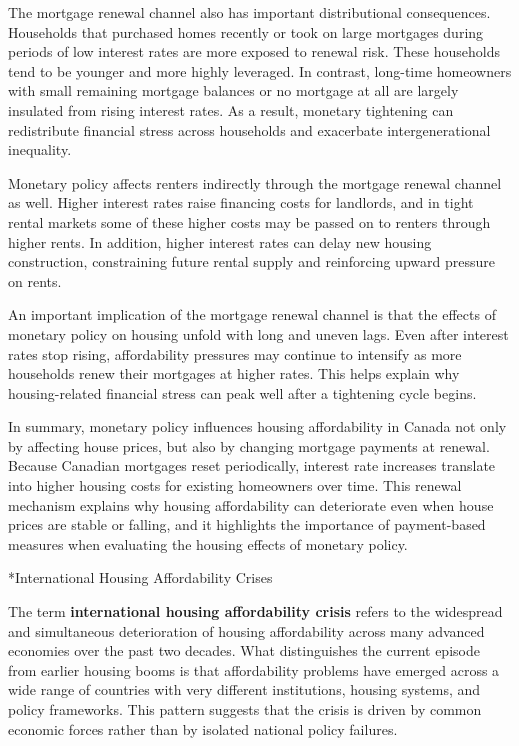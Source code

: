 \documentclass[11pt]{article}
\begin{document}
The mortgage renewal channel also has important distributional consequences. Households that purchased homes recently or took on large mortgages during periods of low interest rates are more exposed to renewal risk. These households tend to be younger and more highly leveraged. In contrast, long-time homeowners with small remaining mortgage balances or no mortgage at all are largely insulated from rising interest rates. As a result, monetary tightening can redistribute financial stress across households and exacerbate intergenerational inequality.

Monetary policy affects renters indirectly through the mortgage renewal channel as well. Higher interest rates raise financing costs for landlords, and in tight rental markets some of these higher costs may be passed on to renters through higher rents. In addition, higher interest rates can delay new housing construction, constraining future rental supply and reinforcing upward pressure on rents.

An important implication of the mortgage renewal channel is that the effects of monetary policy on housing unfold with long and uneven lags. Even after interest rates stop rising, affordability pressures may continue to intensify as more households renew their mortgages at higher rates. This helps explain why housing-related financial stress can peak well after a tightening cycle begins.

In summary, monetary policy influences housing affordability in Canada not only by affecting house prices, but also by changing mortgage payments at renewal. Because Canadian mortgages reset periodically, interest rate increases translate into higher housing costs for existing homeowners over time. This renewal mechanism explains why housing affordability can deteriorate even when house prices are stable or falling, and it highlights the importance of payment-based measures when evaluating the housing effects of monetary policy.

*{International Housing Affordability Crises}

The term \textbf{international housing affordability crisis} refers to the widespread and simultaneous deterioration of housing affordability across many advanced economies over the past two decades. What distinguishes the current episode from earlier housing booms is that affordability problems have emerged across a wide range of countries with very different institutions, housing systems, and policy frameworks. This pattern suggests that the crisis is driven by common economic forces rather than by isolated national policy failures.
\end{document}
